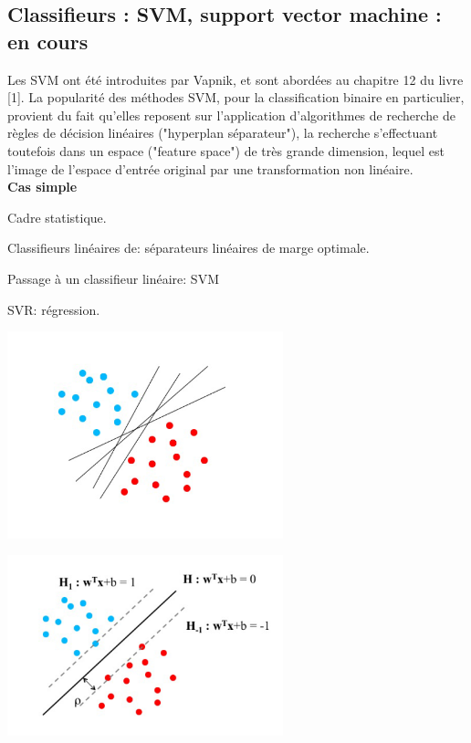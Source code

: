 \documentclass[a4paper]{article}
\theoremstyle{plain}
\begin{document}
\pagebreak
\subsection{Classifieurs : SVM, support vector machine : en cours}

Les SVM ont été introduites par Vapnik, et sont abordées au chapitre 12 du livre [1]. La popularité
des méthodes SVM, pour la classification binaire en particulier, provient du fait qu’elles reposent sur l’application
d’algorithmes de recherche de règles de décision linéaires ("hyperplan séparateur"), la recherche
s’effectuant toutefois dans un espace ("feature space") de très grande dimension, lequel est l’image de
l’espace d’entrée original par une transformation  non linéaire.\\

\textbf{Cas simple}\\

\begin{outline}

\1 Cadre statistique.

\1 Classifieurs linéaires de: séparateurs linéaires de marge optimale.

\1 Passage à un classifieur linéaire: SVM

\1 SVR: régression.
\end{outline}
\includegraphics[width=8cm]{SVM1.png}

\includegraphics[width=8cm]{SVM2.png}
\end{document}
